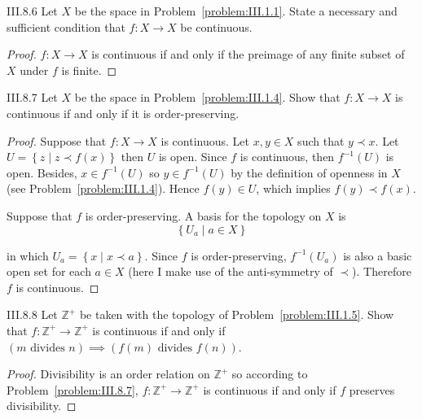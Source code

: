 \begin{problem}{III.8.6}
Let \( X \) be the space in Problem~\ref{problem:III.1.1}. State a necessary and sufficient condition that \( f: X \to X \) be continuous.
\end{problem}

\begin{proof}
	\( f: X \to X \) is continuous if and only if the preimage of any finite subset of \(X\) under \(f\) is finite.
\end{proof}

\begin{problem}{III.8.7}\label{problem:III.8.7}
Let \( X \) be the space in Problem~\ref{problem:III.1.4}. Show that \( f: X \to X \) is continuous if and only if it is order-preserving.
\end{problem}

\begin{proof}
	Suppose that \( f: X \to X \) is continuous. Let \( x, y \in X \) such that \( y \prec x \). Let \( U = \left\{ z \mid z \prec f(x) \right\} \) then \( U \) is open. Since \( f \) is continuous, then \( f^{-1}(U) \) is open. Besides, \( x \in f^{-1}(U) \) so \( y \in f^{-1}(U) \) by the definition of openness in \( X \) (see Problem~\ref{problem:III.1.4}). Hence \( f(y) \in U \), which implies \( f(y) \prec f(x) \).

	Suppose that \( f \) is order-preserving. A basis for the topology on \( X \) is
	\[
		\left\{ U_{a} \mid a \in X \right\}
	\]

	in which \( U_{a} = \left\{ x \mid x \prec a \right\} \). Since \( f \) is order-preserving, \( f^{-1}(U_{a}) \) is also a basic open set for each \( a \in X \) (here I make use of the anti-symmetry of \( \prec \)). Therefore \( f \) is continuous.
\end{proof}

\begin{problem}{III.8.8}
Let \( \mathbb{Z}^{+} \) be taken with the topology of Problem~\ref{problem:III.1.5}. Show that \( f: \mathbb{Z}^{+} \to \mathbb{Z}^{+} \) is continuous if and only if \( (m \text{ divides } n) \implies (f(m) \text{ divides } f(n)) \).
\end{problem}

\begin{proof}
	Divisibility is an order relation on \( \mathbb{Z}^{+} \) so according to Problem~\ref{problem:III.8.7}, \( f: \mathbb{Z}^{+} \to \mathbb{Z}^{+} \) is continuous if and only if \( f \) preserves divisibility.
\end{proof}

